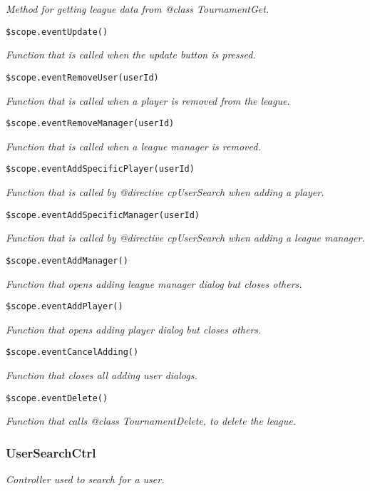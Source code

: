 {\scriptsize
\textit{Method for getting league data from @class TournamentGet.}

}

\texttt{\$scope.eventUpdate()}

{\scriptsize
\textit{Function that is called when the update button is pressed.}

}

\texttt{\$scope.eventRemoveUser(userId)}

{\scriptsize
\textit{Function that is called when a player is removed from the league.}

}

\texttt{\$scope.eventRemoveManager(userId)}

{\scriptsize
\textit{Function that is called when a league manager is removed.}

}

\texttt{\$scope.eventAddSpecificPlayer(userId)}

{\scriptsize
\textit{Function that is called by @directive cpUserSearch when adding a player.}

}

\texttt{\$scope.eventAddSpecificManager(userId)}

{\scriptsize
\textit{Function that is called by @directive cpUserSearch when adding a league manager.}

}

\texttt{\$scope.eventAddManager()}

{\scriptsize
\textit{Function that opens adding league manager dialog but closes others.}

}

\texttt{\$scope.eventAddPlayer()}

{\scriptsize
\textit{Function that opens adding player dialog but closes others.}

}

\texttt{\$scope.eventCancelAdding()}

{\scriptsize
\textit{Function that closes all adding user dialogs.}

}

\texttt{\$scope.eventDelete()}

{\scriptsize
\textit{Function that calls @class TournamentDelete, to delete the league.}

}

\subsubsection{UserSearchCtrl}\label{UserSearchCtrl.js.doc}
\textit{Controller used to search for a user.}

